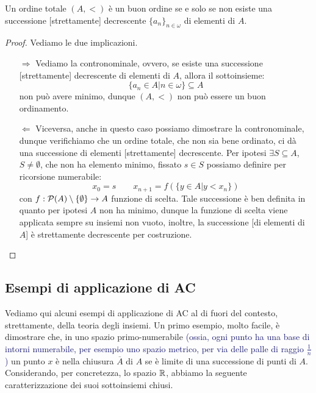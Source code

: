 \begin{proposition}
	Un ordine totale $(A,<)$ è un buon ordine se e solo se non esiste una successione [strettamente] decrescente $\{a_n\}_{n \in \omega}$ di elementi di $A$.
\end{proposition}

\begin{proof}
	Vediamo le due implicazioni.
	\begin{itemize}
		\item[$\boxed{\Longrightarrow}$] Vediamo la contronominale, ovvero, se esiste una successione [strettamente] decrescente di elementi di $A$, allora il sottoinsieme:
		\[ \{a_n \in A | n \in \omega\} \subseteq A
			\]
		non può avere minimo, dunque $(A,<)$ non può essere un buon ordinamento.
		\item[$\boxed{\Longleftarrow}$] Viceversa, anche in questo caso possiamo dimostrare la contronominale, dunque verifichiamo che un ordine totale, che non sia bene ordinato, ci dà una successione di elementi [strettamente] decrescente.
		Per ipotesi $\exists S \subseteq A$, $S \ne \emptyset$, che non ha elemento minimo, fissato $s \in S$ possiamo definire per ricorsione numerabile:
		\[ x_0 = s \qquad x_{n+1} = f(\{y \in A | y < x_n\})
			\]
		con $f : \mathcal{P}(A) \setminus \{\emptyset\} \to A$ funzione di scelta. Tale successione è ben definita in quanto per ipotesi $A$ non ha minimo, dunque la funzione di scelta viene applicata sempre su insiemi non vuoto, inoltre, la successione [di elementi di $A$] è strettamente decrescente per costruzione.
	\end{itemize}	
\end{proof}

\pagebreak

\subsection{Esempi di applicazione di AC}
Vediamo qui alcuni esempi di applicazione di AC al di fuori del contesto, strettamente, della teoria degli insiemi. Un primo esempio, molto facile, è dimostrare che, in uno spazio primo-numerabile \textcolor{MidnightBlue}{(ossia, ogni punto ha una base di intorni numerabile, per esempio uno spazio metrico, per via delle palle di raggio $\frac 1n$)} un punto $x$ è nella 
chiusura $\overline A$ di $A$ se è limite di una successione di punti di $A$. Considerando, per concretezza, lo spazio $\mathbb R$, abbiamo la seguente caratterizzazione dei suoi sottoinsiemi chiusi.


